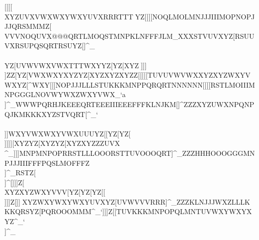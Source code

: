                                                        [[[[\\XYZUVXVWXWXYWXYUVXRRRTTT^^_YZ[                                                            [[[NOQLMOLMNJJJIIIMOPNOPJJJQRSMMMZ[\                                                            \\\VWXYZ[JJJOPROPRKLNOPRSTVZ[\TUV`aa                                                            ^^^NOPIIINOPMNPJJJPQRQRSNNNSTUTUVZ[]                                                            VVVNOQUVX@@@QRTLMOQSTMNPKLNFFFJLM\]_                                                            XXXSTVUVXYZ[RSUUVXRSUPQSQRTRSUYZ[]^_                                                            \\\\\]YZ[UVWVWXVWXTTTWXYYZ[YZ[XYZ^^_                                                            ]]]\\]ZZ[YZ[VWXWXYXYZYZ[XYZXYZXYZZ[\                                                            [[[[\]TUVUVWVWXXYZXYZWXYVWXYZ[\]^WXY                                                            [[[NOPJJJLLLSTUKKKMNPPQRQRTNNNNNN[\]                                                            [[[RSTLMOIIIMNPGGGLNOVWYWXZWXYVWX_`a                                                            \\\JJJLLLQRSMNPKKKLLLNNNSTUVWXQRT]^_                                                            WWWPQRHJKEEEQRTEEEIIIEEEFFFKLNJKM[]^                                                            ZZZXYZUWXNPQNPQJKMKKKXYZSTVQRT[\]^_`                                                            \\\\]]WXYVWXWXYVWXUUUYZ[[\]YZ[YZ[\\]                                                            ]]][\]XYZYZ[XYZYZ[XYZXYZZZ\YZ[WXYZ[\                                                            [[[Z[\[[\VWXWXYVWXWXYWXYVWXUVW\\]UVX                                                            \\\OPRIIIQRTUVWHHHLLLRSTRSTOPROPQ[\]                                                            [[[MNP[\]KKKJJJNOQQRSVWXVWXUVWWXY]^_                                                            ]]]MNPMNPOPRRSTLLLOOORSTTUVOOOQRT]^_                                                            ZZZHHHOOOGGGMNPJJJIIIFFFPQSLMOFFFZ\]                                                            \\\OPRIKLKMNSTVQSTVWY]^_RSTZ[\\]^[\]                                                            ]]]Z[\[\]XYZXYZWXYVVV[\]YZ[YZ[YZ[[\\                                                            ]]]Z[\YZ[YZ[XYZXYZYZ[XYZXYZXYZWXY[\]                                                            ]]]^^_XYZWXYWXYWXYUVXYZ[UVWVVVRRR]^_                                                            ZZZKLNJJJWXZLLLKKKQRSYZ[PQROOOMMM^_`                                                            ]]]Z[[TUVKKKMNPOPQLMNTUVWXYWXYXYZ^_`                                                            \\\UVWNOQQRSLLLNNNNNNLLLOPRQRSMNP]^_                                   